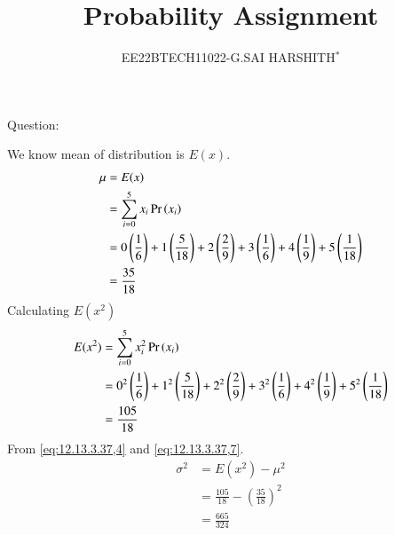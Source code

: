 \documentclass[journal,12pt,twocolumn]{IEEEtran}
\theoremstyle{remark}
\begin{document}

\vspace{3cm}

\title{Probability Assignment}
\author{EE22BTECH11022-G.SAI HARSHITH$^{*}$%
}
\maketitle
\newpage
\bigskip
\renewcommand{\thefigure}{\theenumi}
\renewcommand{\thetable}{\theenumi}

Question: 
\begin{table}[!ht]
	
\end{table}
\solution
We know mean of distribution is $E(x)$.
\begin{align}
\mu&=E(x)\\
&=\sum_{i=0}^{5} x_i\Pr\left(x_i\right)\\
&=0\left(\frac{1}{6}\right)+1\left(\frac{5}{18}\right)+2\left(\frac{2}{9}\right)+3\left(\frac{1}{6}\right)+4\left(\frac{1}{9}\right)+5\left(\frac{1}{18}\right)\\
&=\frac{35}{18}
\label{eq:12.13.3.37,4}
\end{align}
Calculating $E(x^2)$
\begin{align}
E(x^2)&=\sum_{i=0}^{5} x_i^2\Pr\left(x_i\right)\\
&=0^2\left(\frac{1}{6}\right)+1^2\left(\frac{5}{18}\right)+2^2\left(\frac{2}{9}\right)+3^2\left(\frac{1}{6}\right)+4^2\left(\frac{1}{9}\right)+5^2\left(\frac{1}{18}\right)\\
&=\frac{105}{18}
\label{eq:12.13.3.37,7}
\end{align}
From \eqref{eq:12.13.3.37,4} and \eqref{eq:12.13.3.37,7}.
\begin{align}
\sigma^2&=E(x^2)-\mu^2\\
&=\frac{105}{18}-\left(\frac{35}{18}\right)^2\\
&=\frac{665}{324}
\end{align}
\end{document}
